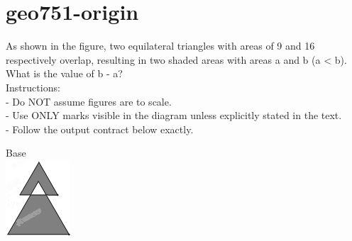 \documentclass[12pt]{article}
\begin{document}
\section*{geo751-origin}
\noindent\begin{minipage}{\textwidth}
\setlength{\parskip}{4pt}
As shown in the figure, two equilateral triangles with areas of 9 and 16 respectively overlap, resulting in two shaded areas with areas a and b (a < b). What is the value of b - a?\\
Instructions:\\
- Do NOT assume figures are to scale.\\
- Use ONLY marks visible in the diagram unless explicitly stated in the text.\\
- Follow the output contract below exactly.\\
\end{minipage}
\begin{center}
\begin{minipage}{0.32\textwidth}\centering
Base\\
\includegraphics[width=0.95\linewidth]{out_rommath_origin/items/geo751-origin/assets/figure.png}
\end{minipage}
\par
\end{center}
\bigskip
\end{document}

